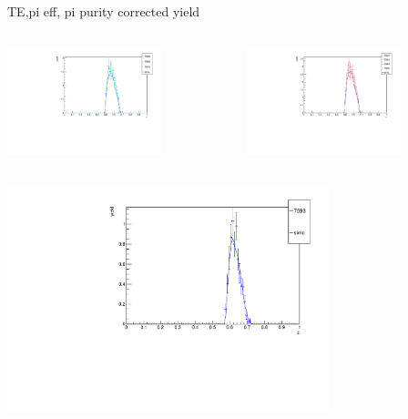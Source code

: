\begin{frame}{TE,pi eff, pi purity corrected yield}
\begin{columns}
\begin{column}[T]{0.5\textwidth}
\includegraphics[width = 0.7\textwidth]{results/yield/check/yieldcheck_430_neg.pdf}
\end{column}
\begin{column}[T]{0.5\textwidth}
\includegraphics[width = 0.7\textwidth]{results/yield/check/yieldcheck_430_pos.pdf}
\end{column}
\end{columns}
\begin{columns}
\begin{column}[T]{0.5\textwidth}
\includegraphics[width = 0.7\textwidth]{results/yield/check/yieldcheck_420_neg.pdf}

\end{column}
\end{columns}
\end{frame}

